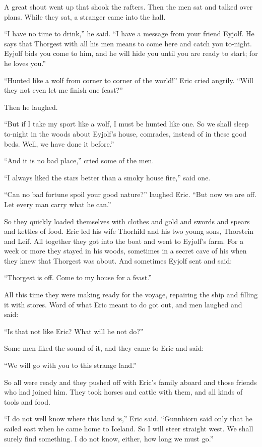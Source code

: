 A great shout went up that shook the rafters. Then the men sat and
talked over plans. While they sat, a stranger came into the hall.

``I have no time to drink,'' he said. ``I have a message from your
friend Eyjolf. He says that Thorgest with all his men means to come here
and catch you to-night. Eyjolf bids you come to him, and he will hide
you until you are ready to start; for he loves you.''

``Hunted like a wolf from corner to corner of the world!'' Eric cried
angrily. ``Will they not even let me finish one feast?''

Then he laughed.

``But if I take my sport like a wolf, I must be hunted like one. So we
shall sleep to-night in the woods about Eyjolf's house, comrades,
instead of in these good beds. Well, we have done it before.''

``And it is no bad place,'' cried some of the men.

``I always liked the stars better than a smoky house fire,'' said one.

``Can no bad fortune spoil your good nature?'' laughed Eric. ``But now
we are off. Let every man carry what he can.''

So they quickly loaded themselves with clothes and gold and swords and
spears and kettles of food. Eric led his wife Thorhild and his two young
sons, Thorstein and Leif. All together they got into the boat and went
to Eyjolf's farm. For a week or more they stayed in his woods, sometimes
in a secret cave of his when they knew that Thorgest was about. And
sometimes Eyjolf sent and said:

``Thorgest is off. Come to my house for a feast.''

All this time they were making ready for the voyage, repairing the ship
and filling it with stores. Word of what Eric meant to do got out, and
men laughed and said:

``Is that not like Eric? What will he not do?''

Some men liked the sound of it, and they came to Eric and said:

``We will go with you to this strange land.''

So all were ready and they pushed off with Eric's family aboard and
those friends who had joined him. They took horses and cattle with them,
and all kinds of tools and food.

``I do not well know where this land is,'' Eric said. ``Gunnbiorn said
only that he sailed east when he came home to Iceland. So I will steer
straight west. We shall surely find something. I do not know, either,
how long we must go.''

